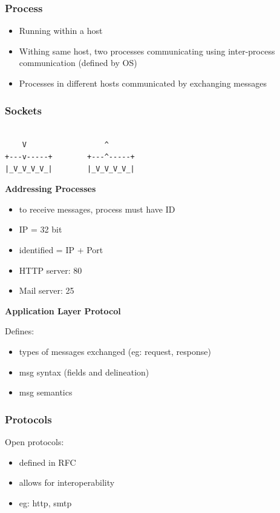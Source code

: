 \documentclass[11pt]{article}
\begin{document}
\subsubsection{Process}
\label{sec:orgabf5fd4}
\begin{itemize}
\item Running within a host
\item Withing same host, two processes communicating using inter-process
communication (defined by OS)
\item Processes in different hosts communicated by exchanging messages
\end{itemize}

\subsubsection{Sockets}
\label{sec:org2315fba}

\begin{verbatim}

    V                  ^
+---v-----+        +---^-----+  
|_V_V_V_V_|        |_V_V_V_V_|

\end{verbatim}

\textbf{Addressing Processes}
\begin{itemize}
\item to receive messages, process must have ID
\item IP = 32 bit
\item identified = IP + Port
\item HTTP server: 80
\item Mail server: 25
\end{itemize}

\textbf{Application Layer Protocol}

Defines:
\begin{itemize}
\item types of messages exchanged (eg: request, response)
\item msg syntax (fields and delineation)
\item msg semantics
\end{itemize}

\subsubsection{Protocols}
\label{sec:org9b1508b}

Open protocols:
\begin{itemize}
\item defined in RFC
\item allows for interoperability
\item eg: http, smtp
\end{itemize}
\end{document}
